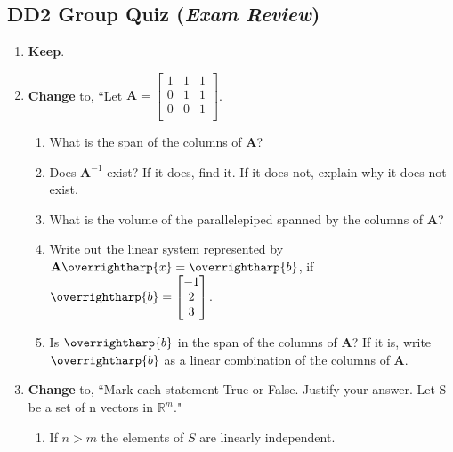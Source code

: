 \documentclass[fleqn]{article}[11pt]
\begin{document}
\subsection*{DD2 Group Quiz (\textit{Exam  Review})}

\begin{enumerate}
	\item \textbf{Keep}.
	
	\item \textbf{Change} to, ``Let \(\mathbf{A}=\begin{bmatrix}
									1 & 1 & 1 \\
									0 & 1 & 1 \\
									0 & 0 & 1 \\
								\end{bmatrix}\).
		\begin{enumerate}[label=\alph*.]
			\item What is the span of the columns of $\mathbf{A}$?
			\item Does $\mathbf{A}^{-1}$ exist? If it does, find it. If it does not, explain why it does not exist.
			\item What is the volume of the parallelepiped spanned by the columns of $\mathbf{A}$?
			\item Write out the linear system represented by $\mathbf{A}\overrightharp{x}=\overrightharp{b}$, if \(\overrightharp{b}=\begin{bmatrix}	
												-1\\
												2 \\
												3 \\													\end{bmatrix}\).
												
			\item Is $\overrightharp{b}$ in the span of the columns of $\mathbf{A}$? If it is, write $\overrightharp{b}$ as a linear combination of the columns of $\mathbf{A}$.
		\end{enumerate}

	\item \textbf{Change} to, ``Mark each statement True or False. Justify your answer. Let S be a set of n vectors in $\mathbb{R}^m$."
	
		\begin{enumerate}
			\item If $n>m$ the elements of $S$ are linearly independent.
			
		\end{enumerate}
	

\end{enumerate}
\end{document}
